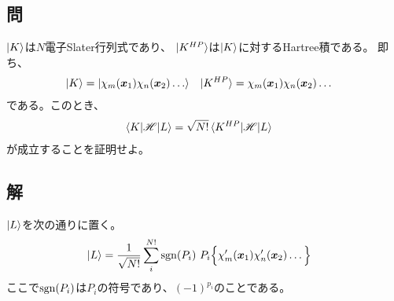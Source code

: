 \subsection{問}
$\ket{K}$は$N$電子Slater行列式であり、
$\ket{K^{HP}}$は$\ket{K}$に対するHartree積である。
即ち、
\begin{align}
	\ket{K}
&=
	\ket{\chi_m(\x_1)\chi_n(\x_2)\dots} &
%
	\ket{K^{HP}}
&=
	\chi_m(\x_1)\chi_n(\x_2)\dots
\end{align}
である。このとき、
\begin{align}
	\braket{K|{\mathscr{H}}|L}
&=
	\sqrt{N!}
	\braket{K^{HP}|{\mathscr{H}}|L}
\end{align}
が成立することを証明せよ。


\subsection{解}
$\ket{L}$を次の通りに置く。
\begin{align}
	\ket{L}
&=
	\frac{1}{\sqrt{N!}}
	\sum_{i}^{N!}
		{\rm sgn}(P_i)\
		P_i\Bigl\{
			\chi_m'({\bm{x}}_1) \chi_n'({\bm{x}}_2) \dots
		\Bigr\}
\end{align}
ここで${\rm sgn}(P_i)$は$P_i$の符号であり、$(-1)^{p_i}$のことである。

